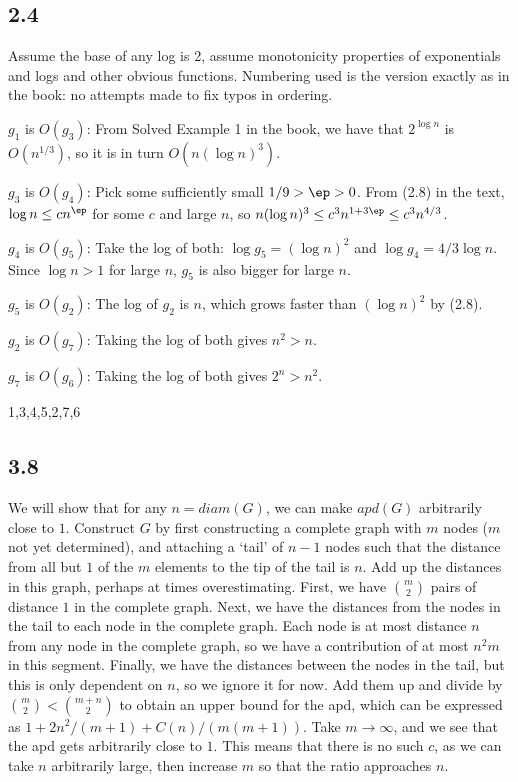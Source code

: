 \documentclass{article}
\begin{document}
\subsection*{2.4}
Assume the base of any log is 2, assume monotonicity properties of exponentials and logs and other obvious functions. Numbering used is the version exactly as in the book: no attempts made to fix typos in ordering.

$g_1$ is $O(g_3)$: From Solved Example 1 {in} the book, we have that $2^{\log n}$ is $O(n^{1/3})$, so it is in turn $O(n(\log n)^3)$.

$g_3$ is $O(g_4)$: Pick some sufficiently small $1/9>\ep>0$. From (2.8) in the text, $\log n\leq cn^\ep$ for some $c$ and large $n$, so $n(\log n)^3\leq c^3n^{1+3\ep}\leq c^3n^{4/3}$.

$g_4$ is $O(g_5)$: Take the log of both: $\log g_5=(\log n)^2$ and $\log g_4=4/3\log n$. Since $\log n>1$ for large $n$, $g_5$ is also bigger for large $n$.

$g_5$ is $O(g_2)$: The log of $g_2$ is $n$, which grows faster than $(\log n)^2$ by (2.8).

$g_2$ is $O(g_7)$: Taking the log of both gives $n^2>n$.

$g_7$ is $O(g_6)$: Taking the log of both gives $2^n>n^2$.

1,3,4,5,2,7,6
\subsection*{3.8}
We will show that for any $n=diam(G)$, we can make $apd(G)$ arbitrarily close to $1$. Construct $G$ by first constructing a complete graph with $m$ nodes ($m$ not yet determined), and attaching a `tail' of $n-1$ nodes such that the distance from all but $1$ of the $m$ elements to the tip of the tail is $n$. Add up the distances in this graph, perhaps at times overestimating. First, we have $\binom{m}{2}$ pairs of distance $1$ in the complete graph. Next, we have the distances from the nodes in the tail to each node in the complete graph. Each node is at most distance $n$ from any node in the complete graph, so we have a contribution of at most $n^2m$ in this segment. Finally, we have the distances between the nodes in the tail, but this is only dependent on $n$, so we ignore it for now. Add them up and divide by $\binom{m}{2}<\binom{m+n}{2}$ to obtain an upper bound for the apd, which can be expressed as $1+2n^2/(m+1)+C(n)/(m(m+1))$. Take $m\to\infty$, and we see that the apd gets arbitrarily close to $1$. This means that there is no such $c$, as we can take $n$ arbitrarily large, then increase $m$ so that the ratio approaches $n$.
\end{document}
